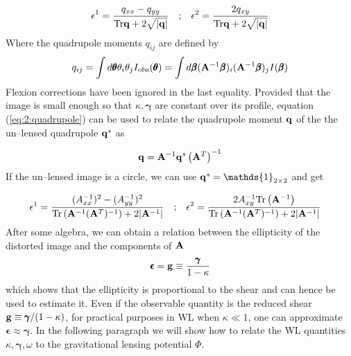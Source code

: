 \begin{equation}
\label{eq:2:ellipticity-1}
\begin{matrix}
\displaystyle \epsilon^1 = \frac{q_{xx}-q_{yy}}{{\rm Tr}\mathbf{q}+2\sqrt{\vert\mathbf{q}\vert}} & ; & \displaystyle \epsilon^2 = \frac{2q_{xy}}{{\rm Tr}\mathbf{q}+2\sqrt{\vert\mathbf{q}\vert}}
\end{matrix}
\end{equation} 
%
Where the quadrupole moments $q_{ij}$ are defined by 
\begin{equation}
\label{eq:2:quadrupole}
q_{ij} = \int d\pmb{\theta} \theta_i\theta_j I_{\rm obs}(\pmb{\theta}) = \int d\pmb{\beta} (\mathbf{A}^{-1}\pmb{\beta})_i(\mathbf{A}^{-1}\pmb{\beta})_j I(\pmb{\beta})
\end{equation}
%
Flexion corrections have been ignored in the last equality. Provided that the image is small enough so that $\kappa,\pmb{\gamma}$ are constant over its profile, equation (\ref{eq:2:quadrupole}) can be used to relate the quadrupole moment $\mathbf{q}$ of the the un--lensed quadrupole $\mathbf{q}^s$ as  

\begin{equation}
\label{ref:4:quadrupole-1}
\mathbf{q} = \mathbf{A}^{-1}\mathbf{q}^s\left(\mathbf{A}^T\right)^{-1}
\end{equation}
%
If the un--lensed image is a circle, we can use $\bb{q}^s=\mathds{1}_{2\times 2}$ and get  

\begin{equation}
\label{eq:2:ellipticity-2}
\begin{matrix}
\displaystyle \epsilon^1 = \frac{(A^{-1}_{xx})^2-(A^{-1}_{yy})^2}{{\rm Tr}\left(\mathbf{A}^{-1}(\mathbf{A}^T)^{-1}\right)+2\vert\mathbf{A}^{-1}\vert} & ; & \displaystyle \epsilon^2 = \frac{2A^{-1}_{xy}{\rm Tr}\left(\mathbf{A}^{-1}\right)}{{\rm Tr}\left(\mathbf{A}^{-1}(\mathbf{A}^T)^{-1}\right)+2\vert\mathbf{A}^{-1}\vert} &
\end{matrix}
\end{equation}
%
After some algebra, we can obtain a relation between the ellipticity of the distorted image and the components of $\mathbf{A}$
\begin{equation}
\label{eq:2:ellipticity-3}
\pmb{\epsilon} = \mathbf{g} \equiv \frac{\pmb{\gamma}}{1-\kappa}
\end{equation}
%
which shows that the ellipticity is proportional to the shear and can hence be used to estimate it. Even if the observable quantity is the reduced shear $\mathbf{g}\equiv \pmb{\gamma}/(1-\kappa)$, for practical purposes in WL when $\kappa\ll 1$, one can approximate $\pmb{\epsilon}\approx \pmb{\gamma}$. In the following paragraph we will show how to relate the WL quantities $\kappa,\pmb{\gamma},\omega$ to the gravitational lensing potential $\Phi$. 

